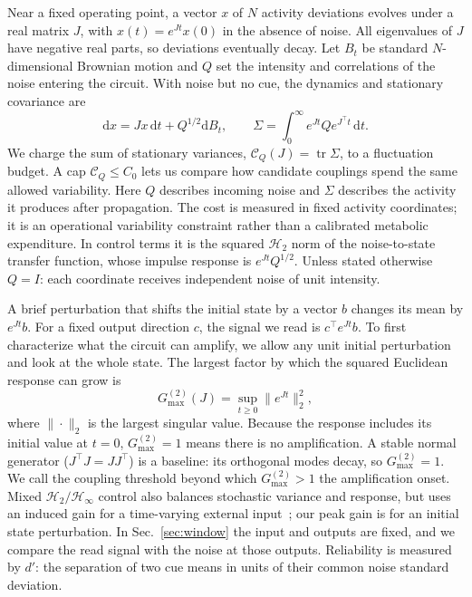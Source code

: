 \documentclass[aps,10pt,onecolumn,superscriptaddress,nofootinbib,longbibliography,
  amsmath,amssymb,floatfix]{revtex4-2}
\newcommand{\Tr}{\operatorname{tr}}
\newcommand{\Gmax}{G_{\max}^{(2)}}
\newcommand{\Cnoise}{\mathcal C}
\newcommand{\dd}{\mathrm{d}}
\begin{document}
Near a fixed operating point, a vector \(x\) of \(N\) activity
deviations evolves under a real matrix \(J\), with
\(x(t)=e^{Jt}x(0)\) in the absence of noise. All eigenvalues of
\(J\) have negative real parts, so deviations eventually decay.
Let \(B_t\) be standard \(N\)-dimensional Brownian motion and
\(Q\) set the intensity and correlations of the noise entering the
circuit. With noise but no cue, the dynamics and stationary
covariance are
\begin{equation}
  \dd x=Jx\,\dd t+Q^{1/2}\dd B_t,\qquad
  \Sigma=\int_0^\infty e^{Jt}Qe^{J^\top t}\,\dd t .
  \label{eq:ou}
\end{equation}
We charge the sum of stationary variances,
\(\Cnoise_Q(J)=\Tr\Sigma\), to a fluctuation budget. A cap
\(\Cnoise_Q\le C_0\) lets us compare how candidate couplings
spend the same allowed variability. Here \(Q\) describes incoming
noise and \(\Sigma\) describes the activity it produces after
propagation. The cost is measured in fixed activity coordinates;
it is an operational variability constraint rather than a
calibrated metabolic expenditure. In control terms it is the
squared \(\mathcal H_2\) norm of the noise-to-state transfer
function, whose impulse response is \(e^{Jt}Q^{1/2}\).
Unless stated otherwise \(Q=I\): each coordinate receives
independent noise of unit intensity.

A brief perturbation that shifts the initial state by a vector \(b\)
changes its mean by \(e^{Jt}b\). For a fixed output direction \(c\),
the signal we read is \(c^\top e^{Jt}b\). To first characterize what
the circuit can amplify, we allow any unit initial perturbation
and look at the whole state. The largest factor by which the
squared Euclidean response can grow is
\begin{equation}
  \Gmax(J)=\sup_{t\ge0}\|e^{Jt}\|_2^2,
  \label{eq:peak}
\end{equation}
where \(\|\cdot\|_2\) is the largest singular value. Because the
response includes its initial value at \(t=0\), \(\Gmax=1\) means
there is no amplification. A stable normal generator
(\(J^\top J=JJ^\top\)) is a baseline: its orthogonal modes decay, so
\(\Gmax=1\). We call the coupling threshold beyond which
\(\Gmax>1\) the amplification onset. Mixed
\(\mathcal H_2/\mathcal H_\infty\) control also balances stochastic
variance and response, but uses an induced gain for a time-varying
external input~\cite{khargonekarrotea1991mixed}; our peak gain is
for an initial state perturbation. In Sec.~\ref{sec:window} the
input and outputs are fixed, and we compare the read signal with
the noise at those outputs. Reliability is measured by \(d'\): the
separation of two cue means in units of their common noise
standard deviation.
\end{document}
